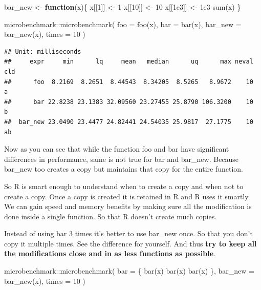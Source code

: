 \documentclass[
]{book}
\newenvironment{Shaded}{\begin{snugshade}}{\end{snugshade}}
\newcommand{\AttributeTok}[1]{\textcolor[rgb]{0.77,0.63,0.00}{#1}}
\newcommand{\ControlFlowTok}[1]{\textcolor[rgb]{0.13,0.29,0.53}{\textbf{#1}}}
\newcommand{\DecValTok}[1]{\textcolor[rgb]{0.00,0.00,0.81}{#1}}
\newcommand{\FloatTok}[1]{\textcolor[rgb]{0.00,0.00,0.81}{#1}}
\newcommand{\FunctionTok}[1]{\textcolor[rgb]{0.00,0.00,0.00}{#1}}
\newcommand{\NormalTok}[1]{#1}
\newcommand{\OtherTok}[1]{\textcolor[rgb]{0.56,0.35,0.01}{#1}}
\newcommand{\SpecialCharTok}[1]{\textcolor[rgb]{0.00,0.00,0.00}{#1}}
\begin{document}
\begin{Shaded}
\begin{Highlighting}[]
\NormalTok{bar\_new }\OtherTok{\textless{}{-}} \ControlFlowTok{function}\NormalTok{(x)\{}
\NormalTok{  x[[}\DecValTok{1}\NormalTok{]] }\OtherTok{\textless{}{-}} \DecValTok{1}
\NormalTok{  x[[}\DecValTok{10}\NormalTok{]] }\OtherTok{\textless{}{-}} \DecValTok{10}
\NormalTok{  x[[}\FloatTok{1e3}\NormalTok{]] }\OtherTok{\textless{}{-}} \FloatTok{1e3}
  \FunctionTok{sum}\NormalTok{(x)}
\NormalTok{\}}

\NormalTok{microbenchmark}\SpecialCharTok{::}\FunctionTok{microbenchmark}\NormalTok{(}
  \AttributeTok{foo =} \FunctionTok{foo}\NormalTok{(x),}
  \AttributeTok{bar =} \FunctionTok{bar}\NormalTok{(x),}
  \AttributeTok{bar\_new =} \FunctionTok{bar\_new}\NormalTok{(x),}
  \AttributeTok{times =} \DecValTok{10}
\NormalTok{)}
\end{Highlighting}
\end{Shaded}

\begin{verbatim}
## Unit: milliseconds
##     expr     min      lq     mean   median      uq      max neval cld
##      foo  8.2169  8.2651  8.44543  8.34205  8.5265   8.9672    10  a 
##      bar 22.8238 23.1383 32.09560 23.27455 25.8790 106.3200    10   b
##  bar_new 23.0490 23.4477 24.82441 24.54035 25.9817  27.1775    10  ab
\end{verbatim}

Now as you can see that while the function foo and bar have significant differences in performance, same is not true for bar and bar\_new. Because bar\_new too creates a copy but maintains that copy for the entire function.

So R is smart enough to understand when to create a copy and when not to create a copy. Once a copy is created it is retained in R and R uses it smartly. We can gain speed and memory benefits by making sure all the modification is done inside a single function. So that R doesn't create much copies.

Instead of using bar 3 times it's better to use bar\_new once. So that you don't copy it multiple times. See the difference for yourself. And thus \textbf{try to keep all the modifications close and in as less functions as possible}.

\begin{Shaded}
\begin{Highlighting}[]
\NormalTok{microbenchmark}\SpecialCharTok{::}\FunctionTok{microbenchmark}\NormalTok{(}
  \AttributeTok{bar =}\NormalTok{ \{}
    \FunctionTok{bar}\NormalTok{(x)}
    \FunctionTok{bar}\NormalTok{(x)}
    \FunctionTok{bar}\NormalTok{(x)}
\NormalTok{    \},}
  \AttributeTok{bar\_new =} \FunctionTok{bar\_new}\NormalTok{(x),}
  \AttributeTok{times =} \DecValTok{10}
\NormalTok{)}
\end{Highlighting}
\end{Shaded}
\end{document}
